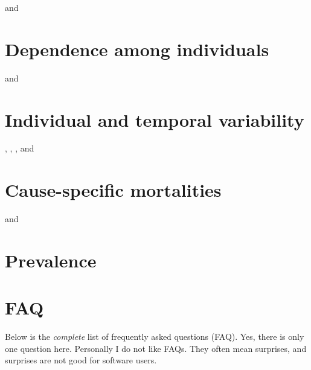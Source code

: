 \documentclass[
  12pt,
]{krantz}
\begin{document}
\citet{PradelEtAl2008} and \citet{genovart_exploiting_2012}

\hypertarget{dependence}{%
\chapter{Dependence among individuals}\label{dependence}}

\citet{culina_multievent_2013} and \citet{cubaynes_modeling_2021}

\hypertarget{covariateselection}{%
\chapter{Individual and temporal variability}\label{covariateselection}}

\citet{grosbois_assessing_2008}, \citet{cubaynes_testing_2012}, \citet{gimenez_semiparametric_2006}, and \citet{bonner_continuous_2010}

\hypertarget{mortalities}{%
\chapter{Cause-specific mortalities}\label{mortalities}}

\citet{fernandez-chacon_causes_2016} and \citet{ruette_comparative_2015}

\hypertarget{prevalence}{%
\chapter{Prevalence}\label{prevalence}}

\citep{santostasi_use_2019}

\hypertarget{faq}{%
\chapter*{FAQ}\label{faq}}


Below is the \emph{complete} list of frequently asked questions (FAQ). Yes, there is only one question here. Personally I do not like FAQs. They often mean surprises, and surprises are not good for software users.
\end{document}
